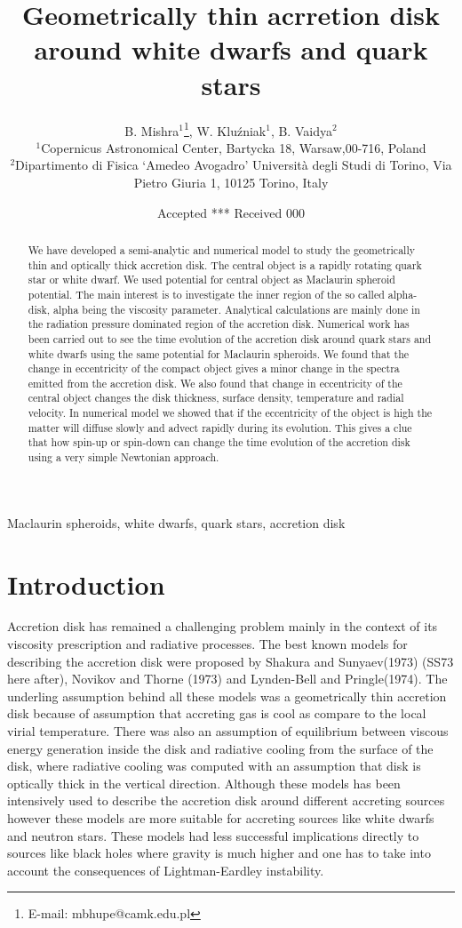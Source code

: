 \documentclass[useAMS,usenatbib]{mn2e}
\title[Geometrically thin acrretion disk around white dwarfs and quark stars]{Geometrically thin acrretion disk around white dwarfs and quark stars}
\author[B. Mishra, W. Klu\'zniak and B. Vaidya]{B. Mishra$^{1}$\thanks{E-mail:
mbhupe@camk.edu.pl}, W. Klu\'zniak$^{1}$, B. Vaidya$^{2}$\\
$^{1}$Copernicus Astronomical Center, Bartycka 18, Warsaw,00-716, Poland\\
$^{2}$Dipartimento di Fisica `Amedeo Avogadro' Università degli Studi di Torino, Via Pietro Giuria 1, 10125 Torino, Italy}
\begin{document}
\date{Accepted *** Received 000}
\pagerange{\pageref{firstpage}--\pageref{lastpage}} 
\maketitle
\label{firstpage}
\begin{abstract}
We have developed a semi-analytic and numerical model to study the geometrically thin and optically thick accretion disk. The central object is a rapidly rotating quark star or white dwarf. We used potential for central object as Maclaurin spheroid potential. The main interest is to investigate the inner region of the so called alpha-disk, alpha being the viscosity parameter. Analytical calculations are mainly done in the radiation pressure dominated region of the accretion disk. Numerical work has been carried out to see the time evolution of the accretion disk around quark stars and white dwarfs using the same potential for Maclaurin spheroids. We found that the change in eccentricity of the compact object gives a minor change in the spectra emitted from the accretion disk. We also found that change in eccentricity of the central object changes the disk thickness, surface density, temperature and radial velocity. In numerical model we showed that if the eccentricity of the object is high the matter will diffuse slowly and advect rapidly during its evolution. This gives a clue that how spin-up or spin-down can change the time evolution of the accretion disk using a very simple Newtonian approach.  
\end{abstract}
\begin{keywords}
Maclaurin spheroids, white dwarfs, quark stars, accretion disk
\end{keywords}
\section{Introduction}
Accretion disk has remained a challenging problem mainly in the context of its viscosity prescription and radiative processes. The best known models for describing the accretion disk were proposed by Shakura and Sunyaev(1973) (SS73 here after), Novikov and Thorne (1973) and Lynden-Bell and Pringle(1974). The underling assumption behind all these models was a geometrically thin accretion disk because of assumption that accreting gas is cool as compare to the local virial temperature. There was also an assumption of equilibrium between viscous energy generation inside the disk and radiative cooling from the surface of the disk, where radiative cooling was computed with an assumption that disk is optically thick in the vertical direction. Although these models has been intensively used to describe the accretion disk around different accreting sources however these models are more suitable for accreting sources like white dwarfs and neutron stars. These models had less successful implications directly to sources like black holes where gravity is much higher and one has to take into account the consequences of Lightman-Eardley instability. 
\end{document}
